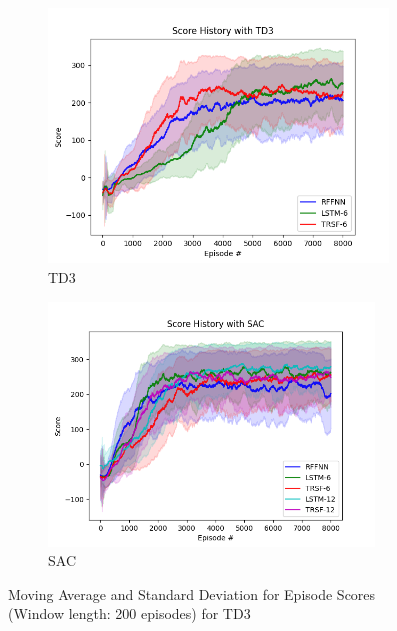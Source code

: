 \begin{figure}[!ht]
	\centering
	\begin{subfigure}{.49\textwidth}
		\centering
		\includegraphics[width=0.99\textwidth]{figures/bipedal/STD_TD3_RFFNN_LSTM-6_TRSF-6.png}
		\caption{TD3}
		\label{fig:td3_std_ep_rewards}
	\end{subfigure}
	\begin{subfigure}{.49\textwidth}
		\centering
		\includegraphics[width=0.95\textwidth]{figures/bipedal/STD_SAC_RFFNN_LSTM-6_TRSF-6_LSTM-12_TRSF-12.png}
		\caption{SAC}
		\label{fig:sac_std_ep_rewards}
	\end{subfigure}
	\caption{Moving Average and Standard Deviation for Episode Scores (Window length: 200 episodes) for TD3}
\end{figure}

